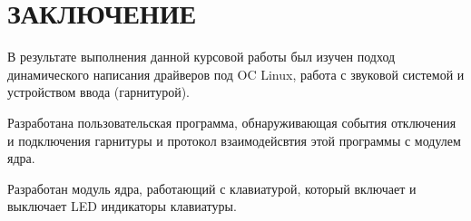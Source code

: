 \section*{ЗАКЛЮЧЕНИЕ}

В результате выполнения данной курсовой работы был изучен подход динамического написания драйверов под OC Linux, работа с звуковой системой и устройством ввода (гарнитурой).

Разработана пользовательская программа, обнаруживающая события отключения и подключения гарнитуры и протокол взаимодейсвтия этой программы с модулем ядра.

Разработан модуль ядра, работающий с клавиатурой, который включает и выключает LED индикаторы клавиатуры.
